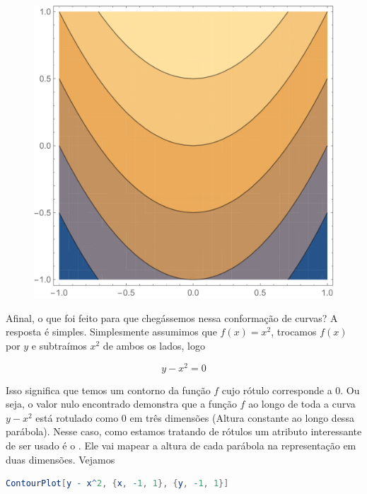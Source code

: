 \documentclass[a4paper, 12pt]{article}
\begin{document}
\begin{figure}[!h]
	\centering
	\includegraphics[scale=.27]{images/ContourPlot}
\end{figure}

	Afinal, o que foi feito para que chegássemos nessa conformação de curvas? A resposta é simples. Simplesmente assumimos que $f(x)=x^{2}$, trocamos $f(x)$ por $y$ e subtraímos $x^{2}$ de ambos os lados, logo
	
	\begin{equation}
		y-x^{2}=0
	\end{equation}
	
	Isso significa que temos um contorno da função $f$ cujo rótulo corresponde a 0. Ou seja, o valor nulo encontrado demonstra que a função $f$ ao longo de toda a curva $y-x^{2}$ está rotulado como 0 em três dimensões (Altura constante ao longo dessa parábola). Nesse caso, como estamos tratando de rótulos um atributo interessante de ser usado é o . Ele vai mapear a altura de cada parábola na representação em duas dimensões. Vejamos
	
\begin{lstlisting}[language=Mathematica]
ContourPlot[y - x^2, {x, -1, 1}, {y, -1, 1}]
\end{lstlisting}
\end{document}

